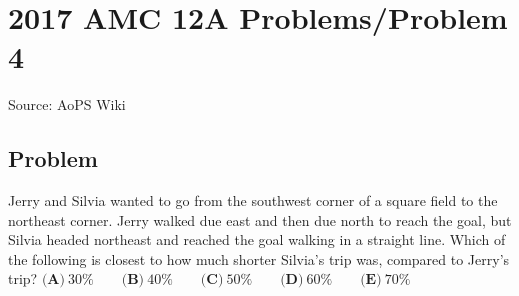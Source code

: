 \documentclass[12pt]{article}
\begin{document}
\section*{{2017 AMC 12A Problems/Problem 4}}
Source: AoPS Wiki

\subsection*{Problem}
Jerry and Silvia wanted to go from the southwest corner of a square field to the northeast corner. Jerry walked due east and then due north to reach the goal, but Silvia headed northeast and reached the goal walking in a straight line. Which of the following is closest to how much shorter Silvia's trip was, compared to Jerry's trip? $\textbf{(A)}\ 30\%\qquad\textbf{(B)}\ 40\%\qquad\textbf{(C)}\ 50\%\qquad\textbf{(D)}\ 60\%\qquad\textbf{(E)}\ 70\%$
\end{document}
